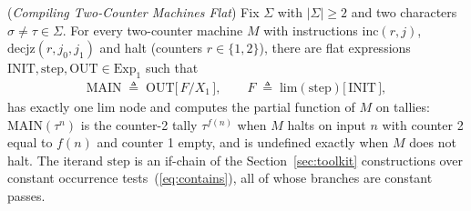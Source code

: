 \begin{theorem}
    (\emph{Compiling Two-Counter Machines Flat})
    \label{thm:lim2cm}
    Fix $\Sigma$ with $|\Sigma| \geq 2$ and two characters
    $\sigma \neq \tau \in \Sigma$. For every two-counter machine $M$ with
    instructions $\mathrm{inc}(r, j)$, $\mathrm{decjz}(r, j_0, j_1)$ and
    halt (counters $r \in \{1, 2\}$), there are flat expressions
    $\mathrm{INIT}, \mathrm{step}, \mathrm{OUT} \in \mathrm{Exp}_1$ such
    that
    \begin{align}
        \mathrm{MAIN} \;\triangleq\; \mathrm{OUT}\big[\,F/X_1\,\big],
        \qquad F \;\triangleq\; \mathrm{lim}(\mathrm{step})\big[\,\mathrm{INIT}\,\big],
    \end{align}
    has exactly one $\mathrm{lim}$ node and computes the partial
    function of $M$ on tallies: $\mathrm{MAIN}(\tau^n)$ is the
    counter-2 tally $\tau^{f(n)}$ when $M$ halts on input $n$ with
    counter 2 equal to $f(n)$ and counter 1 empty, and is undefined
    exactly when $M$ does not halt. The iterand $\mathrm{step}$ is an
    if-chain of the Section~\ref{sec:toolkit} constructions over
    constant occurrence tests~(\ref{eq:contains}), all of whose branches
    are constant passes.
\end{theorem}

